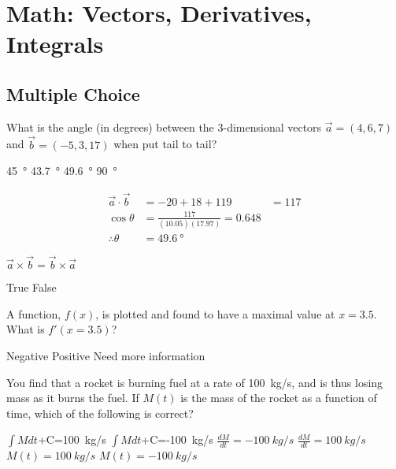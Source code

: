 \section{Math: Vectors, Derivatives, Integrals}

\subsection{Multiple Choice}
\question What is the angle (in degrees) between the 3-dimensional vectors $\vec a=(4,6,7)$ and $\vec b=(-5,3,17)$ when put tail to tail?
\begin{checkboxes}
\choice \SI{45}{\degree}
\choice \SI{43.7}{\degree}
\CorrectChoice \SI{49.6}{\degree} \correct
\choice \SI{90}{\degree}
\end{checkboxes}
\begin{solution}
\begin{align*}
\vec a \cdot \vec b &= -20 + 18+ 119 &= 117\\
\cos\theta &= \frac{117}{(10.05)(17.97)}=0.648\\
\therefore \theta &= \SI{49.6}{\degree}
\end{align*}
\end{solution}

\question $\vec a\times \vec b=\vec b \times \vec a$
\begin{checkboxes}
\choice True
\CorrectChoice False \correct
\end{checkboxes}


\question A function, $f(x)$, is plotted and found to have a maximal value at $x=3.5$. What is $f'(x=3.5)$?
\begin{checkboxes}
\choice Negative
 \correct
\choice Positive
\choice Need more information
\end{checkboxes}


\question You find that a rocket is burning fuel at a rate of \SI{100}{kg/s}, and is thus losing mass as it burns the fuel. If $M(t)$ is the mass of the rocket as a function of time, which of the following is correct?
\begin{checkboxes}
\choice $\int M dt$+C=\SI{100}{kg/s}
\choice $\int M dt$+C=-\SI{100}{kg/s}
\CorrectChoice $\frac{dM}{dt}=-\SI{100}{kg/s}$ \correct
\choice $\frac{dM}{dt}=\SI{100}{kg/s}$
\choice $M(t)=\SI{100}{kg/s}$
\choice $M(t)=-\SI{100}{kg/s}$
\end{checkboxes}


